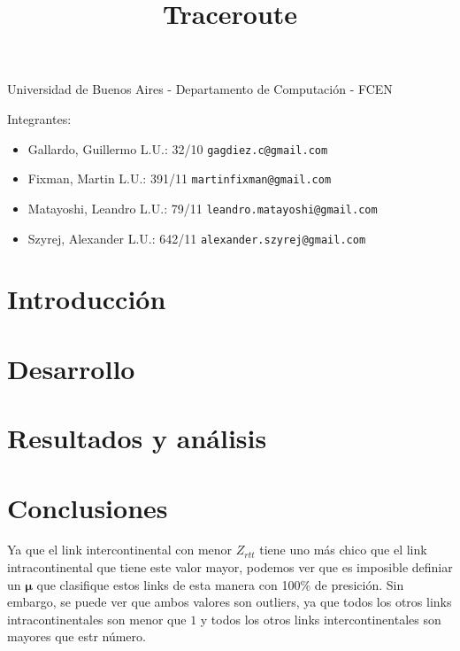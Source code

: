 \documentclass[a4paper,11pt]{article}
\title{Traceroute}
\begin{document}
\maketitle

\begin{center}
	Universidad de Buenos Aires - Departamento de Computaci\'on - FCEN
\end{center}

\vspace{2cm}
Integrantes:

\begin{itemize}
	\item Gallardo, Guillermo L.U.: 32/10 \verb+gagdiez.c@gmail.com+
	\item Fixman, Martin L.U.: 391/11 \verb+martinfixman@gmail.com+
	\item Matayoshi, Leandro L.U.: 79/11 \verb+leandro.matayoshi@gmail.com+
	\item Szyrej, Alexander L.U.: 642/11 \verb+alexander.szyrej@gmail.com+
		
\end{itemize}

\newpage

\tableofcontents

\newpage

\section{Introducci\'on}



\section{Desarrollo}



\clearpage

\section{Resultados y an\'alisis}



\newpage
\section{Conclusiones}

Ya que el link intercontinental con menor $Z_{rtt}$ tiene uno m\'as chico que el link
intracontinental que tiene este valor mayor, podemos ver que es imposible definiar un $\bm{\mu}$ que
clasifique estos links de esta manera con 100\% de presici\'on. Sin embargo, se puede ver que ambos
valores son outliers, ya que todos los otros links intracontinentales son menor que $1$ y todos los
otros links intercontinentales son mayores que estr n\'umero.
\end{document}
